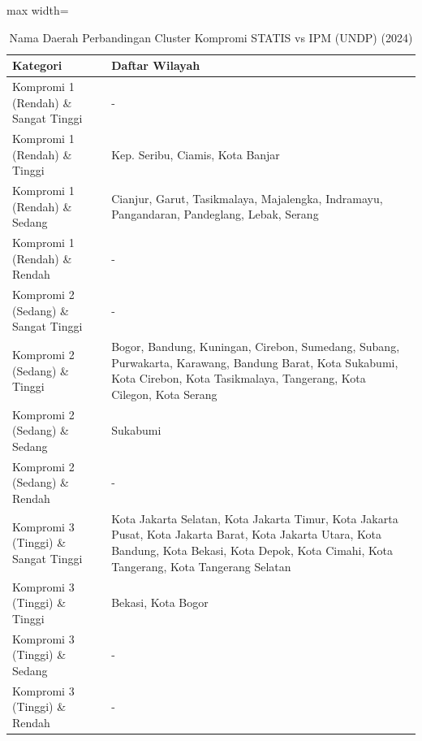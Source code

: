 \begin{table}[H]
\centering
\caption{Nama Daerah Perbandingan Cluster Kompromi STATIS vs IPM (UNDP) (2024)} \label{tab:app1comp_ipm_name_2024}
\begin{adjustbox}{max width=\textwidth}
\begin{tabular}{|p{4cm}|p{10cm}|}
\hline
\textbf{Kategori} & \textbf{Daftar Wilayah} \\
\hline
Kompromi 1 (Rendah) \& Sangat Tinggi & - \\
\hline
Kompromi 1 (Rendah) \& Tinggi & Kep. Seribu, Ciamis, Kota Banjar \\
\hline
Kompromi 1 (Rendah) \& Sedang & Cianjur, Garut, Tasikmalaya, Majalengka, Indramayu, Pangandaran, Pandeglang, Lebak, Serang \\
\hline
Kompromi 1 (Rendah) \& Rendah & - \\
\hline
Kompromi 2 (Sedang) \& Sangat Tinggi & - \\
\hline
Kompromi 2 (Sedang) \& Tinggi & Bogor, Bandung, Kuningan, Cirebon, Sumedang, Subang, Purwakarta, Karawang, Bandung Barat, Kota Sukabumi, Kota Cirebon, Kota Tasikmalaya, Tangerang, Kota Cilegon, Kota Serang \\
\hline
Kompromi 2 (Sedang) \& Sedang & Sukabumi \\
\hline
Kompromi 2 (Sedang) \& Rendah & - \\
\hline
Kompromi 3 (Tinggi) \& Sangat Tinggi & Kota Jakarta Selatan, Kota Jakarta Timur, Kota Jakarta Pusat, Kota Jakarta Barat, Kota Jakarta Utara, Kota Bandung, Kota Bekasi, Kota Depok, Kota Cimahi, Kota Tangerang, Kota Tangerang Selatan \\
\hline
Kompromi 3 (Tinggi) \& Tinggi & Bekasi, Kota Bogor \\
\hline
Kompromi 3 (Tinggi) \& Sedang & - \\
\hline
Kompromi 3 (Tinggi) \& Rendah & - \\
\hline
\end{tabular}
\end{adjustbox}
\end{table}